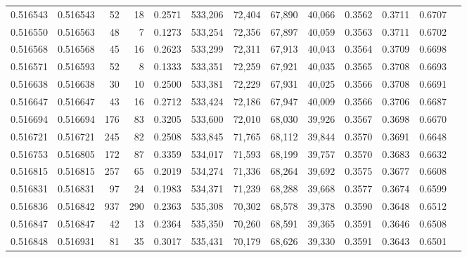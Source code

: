 \begin{tabular}{rrrrrrrrrrrrr}
0.516543 & 0.516543 &    52 &    18 &                                     0.2571 & 533,206 &  72,404 &  67,890 &  40,066 & 0.3562 & 0.3711 & 0.6707 \\
0.516550 & 0.516563 &    48 &     7 &                                     0.1273 & 533,254 &  72,356 &  67,897 &  40,059 & 0.3563 & 0.3711 & 0.6702 \\
0.516568 & 0.516568 &    45 &    16 &                                     0.2623 & 533,299 &  72,311 &  67,913 &  40,043 & 0.3564 & 0.3709 & 0.6698 \\
0.516571 & 0.516593 &    52 &     8 &                                     0.1333 & 533,351 &  72,259 &  67,921 &  40,035 & 0.3565 & 0.3708 & 0.6693 \\
0.516638 & 0.516638 &    30 &    10 &                                     0.2500 & 533,381 &  72,229 &  67,931 &  40,025 & 0.3566 & 0.3708 & 0.6691 \\
0.516647 & 0.516647 &    43 &    16 &                                     0.2712 & 533,424 &  72,186 &  67,947 &  40,009 & 0.3566 & 0.3706 & 0.6687 \\
0.516694 & 0.516694 &   176 &    83 &                                     0.3205 & 533,600 &  72,010 &  68,030 &  39,926 & 0.3567 & 0.3698 & 0.6670 \\
0.516721 & 0.516721 &   245 &    82 &                                     0.2508 & 533,845 &  71,765 &  68,112 &  39,844 & 0.3570 & 0.3691 & 0.6648 \\
0.516753 & 0.516805 &   172 &    87 &                                     0.3359 & 534,017 &  71,593 &  68,199 &  39,757 & 0.3570 & 0.3683 & 0.6632 \\
0.516815 & 0.516815 &   257 &    65 &                                     0.2019 & 534,274 &  71,336 &  68,264 &  39,692 & 0.3575 & 0.3677 & 0.6608 \\
0.516831 & 0.516831 &    97 &    24 &                                     0.1983 & 534,371 &  71,239 &  68,288 &  39,668 & 0.3577 & 0.3674 & 0.6599 \\
0.516836 & 0.516842 &   937 &   290 &                                     0.2363 & 535,308 &  70,302 &  68,578 &  39,378 & 0.3590 & 0.3648 & 0.6512 \\
0.516847 & 0.516847 &    42 &    13 &                                     0.2364 & 535,350 &  70,260 &  68,591 &  39,365 & 0.3591 & 0.3646 & 0.6508 \\
0.516848 & 0.516931 &    81 &    35 &                                     0.3017 & 535,431 &  70,179 &  68,626 &  39,330 & 0.3591 & 0.3643 & 0.6501 \\

\end{tabular}
